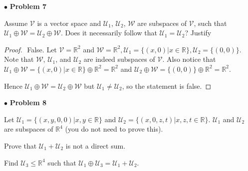 \documentclass{article}
\begin{document}
\newpage
$\bullet$ \textbf{Problem 7}
\medskip

\begin{itshape}
Assume $\mathcal{V}$ is a vector space and $\mathcal{U}_{1}$, $\mathcal{U}_{2}$, $\mathcal{W}$ are subspaces of $\mathcal{V}$, such that $\mathcal{U}_{1} \oplus \mathcal{W} = \mathcal{U}_{2} \oplus \mathcal{W}$. Does it necessarily follow that $\mathcal{U}_{1}=\mathcal{U}_{2}$? Justify
\end{itshape}
\medskip

\begin{proof}
$ $ \newline
False. Let $\mathcal{V} = \mathbb{R}^2$ and $\mathcal{W} = \mathbb{R}^2, \mathcal{U}_1 = \{ (x, 0 ) | x \in \mathbb{R} \}, \mathcal{U}_2 = \{ (0,0) \}$. Note that $\mathcal{W}$, $\mathcal{U}_1$, and $\mathcal{U}_2$ are indeed subspaces of $\mathcal{V}$. Also notice that $\mathcal{U}_1 \oplus \mathcal{W} = \{ (x,0) | x \in \mathbb{R} \} \oplus \mathbb{R}^2 = \mathbb{R}^2$ and $\mathcal{U}_2 \oplus \mathcal{W} = \{ (0,0) \} \oplus \mathbb{R}^2 = \mathbb{R}^2$.

Hence $\mathcal{U}_{1} \oplus \mathcal{W} = \mathcal{U}_{2} \oplus \mathcal{W}$ but $\mathcal{U}_1 \ne \mathcal{U}_2$, so the statement is false.
\end{proof}


\newpage
$\bullet$ \textbf{Problem 8}
\medskip

\begin{itshape}
Let $\mathcal{U}_{1} = \{ (x,y,0,0) | x, y \in \mathbb{R} \}$ and $\mathcal{U}_{2} = \{ (x,0,z,t) | x, z, t \in \mathbb{R} \}$. $\mathcal{U}_{1}$ and $\mathcal{U}_{2}$ are subspaces of $\mathbb{R}^4$ (you do not need to prove this).

Prove that $\mathcal{U}_{1} + \mathcal{U}_{2}$ is not a direct sum.

Find $\mathcal{U}_{3} \le \mathbb{R}^4$ such that $\mathcal{U}_{1} \oplus \mathcal{U}_{3} = \mathcal{U}_{1} + \mathcal{U}_{2}$.
\end{itshape}
\medskip
\end{document}
